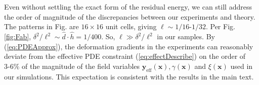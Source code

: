 \documentclass[aps,11pt,tightenlines,notitlepage,superscriptaddress,longbibliography,nofootinbib]{revtex4-1}
\begin{document}
Even without settling the exact form of the residual energy, we can still address the order of magnitude of the discrepancies between our experiments and theory. The patterns in Fig. are $16\times16$ unit cells, giving $\ell \sim 1/16\mbox{-}1/32$. Per Fig.\;\ref{fig:Fab},  $\delta^2/\ell^2 \sim \hat{d}\cdot \hat{h} = 1/400$. So, $\ell \gg \delta^2/\ell^2$ in our samples.  By (\ref{eq:PDEApprox}), the deformation gradients in the experiments can reasonably deviate from the effective PDE constraint (\ref{eq:effectDescribe}) on the order of $3\mbox{-}6\%$ of the magnitude of the field variables $\mathbf{y}_{\text{eff}}(\mathbf{x}), \gamma(\mathbf{x})$ and $\xi(\mathbf{x})$ used in our simulations. This expectation is  consistent with the results   in the main text. 




 




\end{document}
